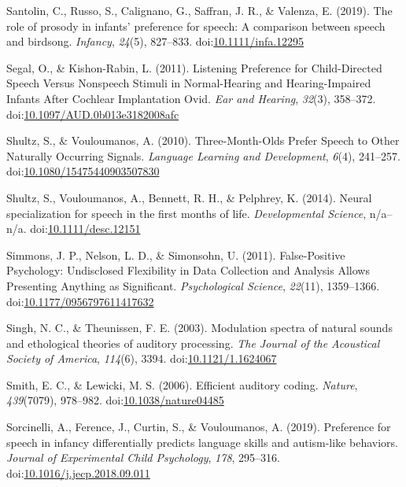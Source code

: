 \documentclass[man]{apa6}
\begin{document}
\hypertarget{ref-santolin_role_2019}{}
Santolin, C., Russo, S., Calignano, G., Saffran, J. R., \& Valenza, E.
(2019). The role of prosody in infants' preference for speech: A
comparison between speech and birdsong. \emph{Infancy}, \emph{24}(5),
827--833.
doi:\href{https://doi.org/10.1111/infa.12295}{10.1111/infa.12295}

\hypertarget{ref-segal_listening_2011}{}
Segal, O., \& Kishon-Rabin, L. (2011). Listening Preference for
Child-Directed Speech Versus Nonspeech Stimuli in Normal-Hearing and
Hearing-Impaired Infants After Cochlear Implantation Ovid. \emph{Ear and
Hearing}, \emph{32}(3), 358--372.
doi:\href{https://doi.org/10.1097/AUD.0b013e3182008afc}{10.1097/AUD.0b013e3182008afc}

\hypertarget{ref-shultz_three-month-olds_2010}{}
Shultz, S., \& Vouloumanos, A. (2010). Three-Month-Olds Prefer Speech to
Other Naturally Occurring Signals. \emph{Language Learning and
Development}, \emph{6}(4), 241--257.
doi:\href{https://doi.org/10.1080/15475440903507830}{10.1080/15475440903507830}

\hypertarget{ref-shultz_neural_2014}{}
Shultz, S., Vouloumanos, A., Bennett, R. H., \& Pelphrey, K. (2014).
Neural specialization for speech in the first months of life.
\emph{Developmental Science}, n/a--n/a.
doi:\href{https://doi.org/10.1111/desc.12151}{10.1111/desc.12151}

\hypertarget{ref-simmons_false-positive_2011}{}
Simmons, J. P., Nelson, L. D., \& Simonsohn, U. (2011). False-Positive
Psychology: Undisclosed Flexibility in Data Collection and Analysis
Allows Presenting Anything as Significant. \emph{Psychological Science},
\emph{22}(11), 1359--1366.
doi:\href{https://doi.org/10.1177/0956797611417632}{10.1177/0956797611417632}

\hypertarget{ref-singh_modulation_2003}{}
Singh, N. C., \& Theunissen, F. E. (2003). Modulation spectra of natural
sounds and ethological theories of auditory processing. \emph{The
Journal of the Acoustical Society of America}, \emph{114}(6), 3394.
doi:\href{https://doi.org/10.1121/1.1624067}{10.1121/1.1624067}

\hypertarget{ref-smith_efficient_2006}{}
Smith, E. C., \& Lewicki, M. S. (2006). Efficient auditory coding.
\emph{Nature}, \emph{439}(7079), 978--982.
doi:\href{https://doi.org/10.1038/nature04485}{10.1038/nature04485}

\hypertarget{ref-sorcinelli_preference_2019}{}
Sorcinelli, A., Ference, J., Curtin, S., \& Vouloumanos, A. (2019).
Preference for speech in infancy differentially predicts language skills
and autism-like behaviors. \emph{Journal of Experimental Child
Psychology}, \emph{178}, 295--316.
doi:\href{https://doi.org/10.1016/j.jecp.2018.09.011}{10.1016/j.jecp.2018.09.011}
\end{document}

